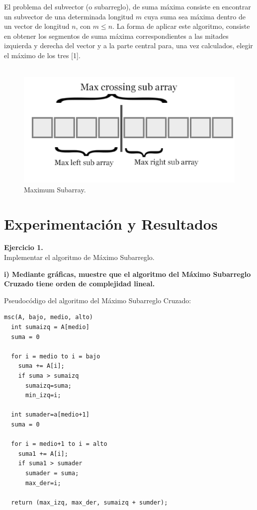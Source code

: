 \documentclass[12pt]{report}
\begin{document}
	El problema del subvector (o subarreglo), de suma máxima consiste en encontrar un subvector de una determinada longitud $m$ cuya suma sea máxima dentro de un vector de longitud $n$, con $m \leq n$. La forma de aplicar este algoritmo, consiste en obtener los segmentos de suma máxima correspondientes a las mitades izquierda y derecha del vector y a la parte central para, una vez calculados, elegir el máximo de los tres [1].\\	
	
		\textbf{\\}
		\begin{figure}[H]
			\includegraphics[width=12cm]{imagenes/1.png}
			\centering
			\caption{Maximum Subarray.}
			\centering
		\end{figure}
		
	\newpage
	
	\section{Experimentación y Resultados}	
	\textbf{Ejercicio 1.}\\
	Implementar el algoritmo de Máximo Subarreglo.\newline
	
	\textbf{i) Mediante gráficas, muestre que el algoritmo del Máximo Subarreglo Cruzado tiene orden de complejidad lineal.}\newline
	
	Pseudocódigo del algoritmo del Máximo Subarreglo Cruzado:
	\lstset{language=C, breaklines=true, basicstyle=\footnotesize}
	\lstset{numbers=left, numberstyle=\tiny, stepnumber=1, numbersep=10pt}
	\begin{lstlisting}
msc(A, bajo, medio, alto)
  int sumaizq = A[medio]
  suma = 0
    
  for i = medio to i = bajo
    suma += A[i]; 		
    if suma > sumaizq 	
      sumaizq=suma; 	
      min_izq=i;		
  
  int sumader=a[medio+1]
  suma = 0 
  
  for i = medio+1 to i = alto
    suma1 += A[i];		
    if suma1 > sumader	
      sumader = suma;	
      max_der=i;		

  return (max_izq, max_der, sumaizq + sumder);
	\end{lstlisting}
	
\end{document}
